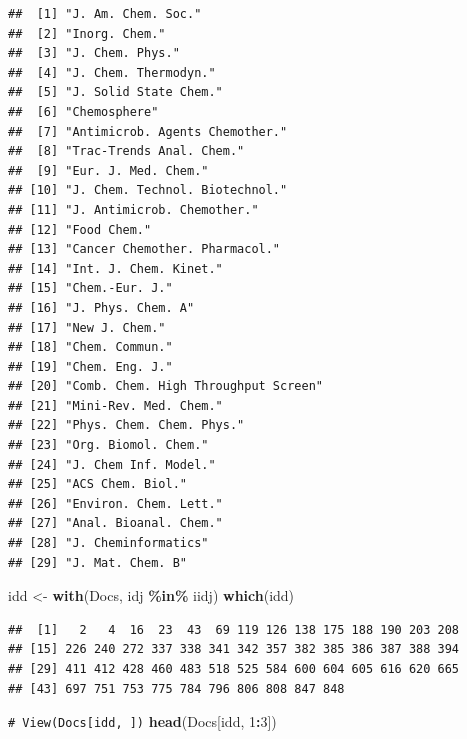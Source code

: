 \documentclass[
]{book}
\newenvironment{Shaded}{\begin{snugshade}}{\end{snugshade}}
\newcommand{\CommentTok}[1]{\textcolor[rgb]{0.56,0.35,0.01}{\textit{#1}}}
\newcommand{\DecValTok}[1]{\textcolor[rgb]{0.00,0.00,0.81}{#1}}
\newcommand{\FunctionTok}[1]{\textcolor[rgb]{0.13,0.29,0.53}{\textbf{#1}}}
\newcommand{\NormalTok}[1]{#1}
\newcommand{\OtherTok}[1]{\textcolor[rgb]{0.56,0.35,0.01}{#1}}
\newcommand{\SpecialCharTok}[1]{\textcolor[rgb]{0.81,0.36,0.00}{\textbf{#1}}}
\theoremstyle{break}
\theoremstyle{nonumberplain}
\renewcommand{\CommentTok}[1]{\textcolor[rgb]{0.41,0.41,0.41}{\texttt{#1}}}
\begin{document}
\begin{verbatim}
##  [1] "J. Am. Chem. Soc."                 
##  [2] "Inorg. Chem."                      
##  [3] "J. Chem. Phys."                    
##  [4] "J. Chem. Thermodyn."               
##  [5] "J. Solid State Chem."              
##  [6] "Chemosphere"                       
##  [7] "Antimicrob. Agents Chemother."     
##  [8] "Trac-Trends Anal. Chem."           
##  [9] "Eur. J. Med. Chem."                
## [10] "J. Chem. Technol. Biotechnol."     
## [11] "J. Antimicrob. Chemother."         
## [12] "Food Chem."                        
## [13] "Cancer Chemother. Pharmacol."      
## [14] "Int. J. Chem. Kinet."              
## [15] "Chem.-Eur. J."                     
## [16] "J. Phys. Chem. A"                  
## [17] "New J. Chem."                      
## [18] "Chem. Commun."                     
## [19] "Chem. Eng. J."                     
## [20] "Comb. Chem. High Throughput Screen"
## [21] "Mini-Rev. Med. Chem."              
## [22] "Phys. Chem. Chem. Phys."           
## [23] "Org. Biomol. Chem."                
## [24] "J. Chem Inf. Model."               
## [25] "ACS Chem. Biol."                   
## [26] "Environ. Chem. Lett."              
## [27] "Anal. Bioanal. Chem."              
## [28] "J. Cheminformatics"                
## [29] "J. Mat. Chem. B"
\end{verbatim}

\begin{Shaded}
\begin{Highlighting}[]
\NormalTok{idd }\OtherTok{\textless{}{-}} \FunctionTok{with}\NormalTok{(Docs, idj }\SpecialCharTok{\%in\%}\NormalTok{ iidj)}
\FunctionTok{which}\NormalTok{(idd)}
\end{Highlighting}
\end{Shaded}

\begin{verbatim}
##  [1]   2   4  16  23  43  69 119 126 138 175 188 190 203 208
## [15] 226 240 272 337 338 341 342 357 382 385 386 387 388 394
## [29] 411 412 428 460 483 518 525 584 600 604 605 616 620 665
## [43] 697 751 753 775 784 796 806 808 847 848
\end{verbatim}

\begin{Shaded}
\begin{Highlighting}[]
\CommentTok{\# View(Docs[idd, ])}
\FunctionTok{head}\NormalTok{(Docs[idd, }\DecValTok{1}\SpecialCharTok{:}\DecValTok{3}\NormalTok{])}
\end{Highlighting}
\end{Shaded}
\end{document}
